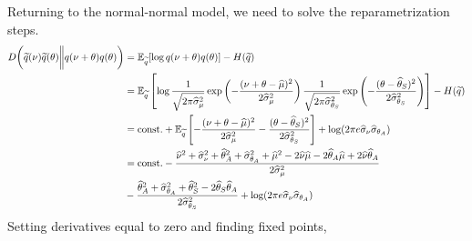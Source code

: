 \documentclass{article}
\begin{document}
 Returning to the normal-normal model, we need to solve the reparametrization steps. 
\begin{align}
D\bigg(\widetilde q(\nu)\widetilde q(\theta)\bigg\|q(\nu+\theta)q(\theta)\bigg)
&=\mathbb{E}_{\widetilde q}[\log q(\nu+\theta)q(\theta)] - H(\widetilde q) \\
&=\mathbb{E}_{\widetilde q}\left[\log 
\frac{1}{\sqrt{2\pi\widehat\sigma_{\mu}^2}}\exp\left(-\frac{(\nu+\theta - \widehat\mu)^2}{2\widehat\sigma_{\mu}^2}\right)
\frac{1}{\sqrt{2\pi\widehat\sigma_{\theta_S}^2}}\exp\left(-\frac{(\theta - \widehat\theta_S)^2}{2\widehat\sigma_{\theta_S}^2}\right)
\right] - H(\widetilde q) \\
&=\text{const.} +  \mathbb{E}_{\widetilde q}\left[-\frac{(\nu+\theta - \widehat\mu)^2}{2\widehat\sigma_{\mu}^2}
-\frac{(\theta - \widehat\theta_S)^2}{2\widehat\sigma_{\theta_S}^2}
\right] 
+ \log(2\pi e\widehat\sigma_{\nu}\widehat\sigma_{\theta_A}) \\
&=\text{const.}  
-\frac{
\widehat\nu^2+\widehat\sigma_\nu^2+\widehat\theta_A^2 + \widehat\sigma_{\theta_A}^2 + \widehat\mu^2 - 2\widehat\nu\widehat\mu-2\widehat\theta_A\widehat\mu + 2\widehat\nu\widehat\theta_A}{2\widehat\sigma_{\mu}^2} \\
&-\frac{\widehat\theta_A^2+ \widehat\sigma_{\theta_A}^2 + \widehat\theta_S^2 - 2\widehat\theta_S\widehat\theta_A}{2\widehat\sigma_{\theta_S}^2}
+ \log(2\pi e\widehat\sigma_{\nu}\widehat\sigma_{\theta_A}) 
\end{align}
Setting derivatives equal to zero and finding fixed points,
\end{document}

